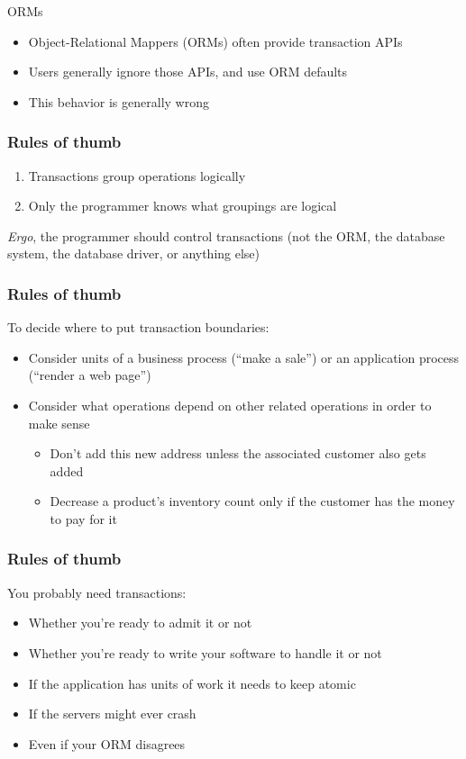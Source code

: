 \documentclass[svgnames]{beamer}
\begin{document}
\begin{frame}{ORMs}
    \begin{itemize}
        \item Object-Relational Mappers (ORMs) often provide transaction APIs
        \item Users generally ignore those APIs, and use ORM defaults
        \item This behavior is generally wrong
    \end{itemize}
\end{frame}

\begin{frame}
    \frametitle{Rules of thumb}
    \begin{enumerate}
        \item Transactions group operations logically
        \item Only the programmer knows what groupings are logical
    \end{enumerate}
\textit{Ergo}, the programmer should control transactions (not the ORM, the database system, the database driver, or anything else)
\end{frame}

\begin{frame}
    \frametitle{Rules of thumb}
    To decide where to put transaction boundaries:
    \begin{itemize}
        \item Consider units of a business process (``make a sale'') or an application process (``render a web page'')
        \item Consider what operations depend on other related operations in order to make sense
        \begin{itemize}
            \item Don't add this new address unless the associated customer also gets added
            \item Decrease a product's inventory count only if the customer has the money to pay for it
        \end{itemize}
    \end{itemize}
\end{frame}

\begin{frame}
    \frametitle{Rules of thumb}
    You probably need transactions:
    \begin{itemize}
        \item Whether you're ready to admit it or not
        \item Whether you're ready to write your software to handle it or not
        \item If the application has units of work it needs to keep atomic
        \item If the servers might ever crash
        \item Even if your ORM disagrees
    \end{itemize}
\end{frame}
\end{document}
